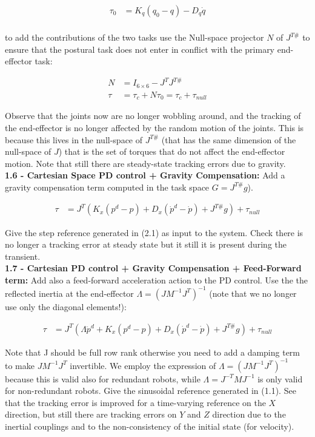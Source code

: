 \documentclass[11pt]{article}
\begin{document}
\begin{align}
\tau_0& = K_q(q_0-q) - D_q\dot{q}\\
\end{align}

to add the contributions of the two  tasks use the Null-space projector $N$ of $J^{T\#}$ to ensure that the postural task does not enter in conflict with the primary end-effector task:

\begin{align}
N & = I_{6 \times 6} - J^T J^{T\#}\\
\tau& = \tau_c  + N\tau_0 =  \tau_c  + \tau_{null}
\end{align}

Observe that the joints now are no longer wobbling around, and the tracking of the end-effector is no longer affected by the random motion of the joints. 
This is because this lives in the null-space of $J^{T\#}$ (that has the same dimension of the null-space of $J$) that is the set of torques that do not affect the end-effector motion. Note that still there are steady-state tracking errors due to gravity.\\


\textbf{1.6 - Cartesian Space PD control + Gravity Compensation:}
Add a gravity compensation term computed in the task space $G= J^{T\#}g$).

\begin{align}
\tau & = J^T\left( K_x(p^d - p) + D_x(\dot{p}^d -\dot{p})  + J^{T\#}g \right) + \tau_{null}
\end{align}

Give the step reference generated in (2.1) as input to the system. 
Check there is no longer a  tracking error at steady state but  it still it is present during the transient. \\


\textbf{1.7 - Cartesian PD control  + Gravity Compensation + Feed-Forward term:}
Add also a feed-forward acceleration action to the PD control. Use the the reflected inertia
at the end-effector $\Lambda = (J M^{-1} J^T)^{-1}$ (note that we no longer use only the diagonal elements!):

\begin{align}
\tau & = J^T\left( \Lambda \ddot{p}^d + K_x(p^d - p) + D_x(\dot{p}^d -\dot{p})  + J^{T\#}g \right) + \tau_{null}
\end{align}

Note that J should be full row rank  otherwise you need to add a damping term to make $JM^{-1}J^T$ invertible.
We employ the expression of $\Lambda = (JM^{-1}J^T)^{-1}$ because this is valid also for redundant robots, while $\Lambda = J^{-T}M J^{-1}$ is only  valid for non-redundant robots. 
Give the sinusoidal reference generated in (1.1). See that the tracking error is improved for a time-varying reference on the $X$ direction, but still there are tracking errors on $Y$ and $Z$ direction due to the inertial couplings and to the non-consistency of the initial state (for velocity).\\
\end{document}
